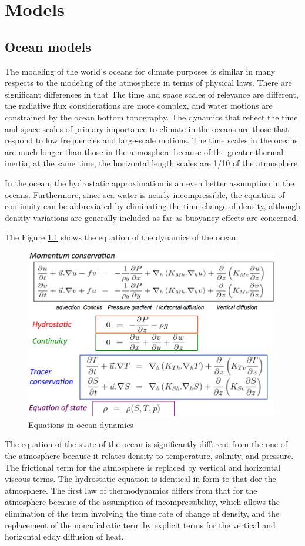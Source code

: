 
\chapter{Models}
\section{Ocean models}
The modeling of the world's oceans for climate purposes is similar in many respects to the modeling of the atmosphere in terms of physical laws. There are significant differences in that
The time and space scales of relevance are different, the radiative flux considerations are more complex, and water motions are constrained by the ocean bottom topography.
The dynamics that reflect the time and space scales of primary importance to climate in the oceans are those that respond to low frequencies and large-scale motions.
The time scales in the oceans are much longer than those in the atmosphere because of the greater thermal inertia; at the same time, the horizontal length scales are 1/10 of the atmosphere.

In the ocean, the hydrostatic approximation is an even better assumption in the oceans. Furthermore, since sea water is nearly incompressible, the equation of continuity can be abbreviated by eliminating the time change of density, although density variations are generally included as far as buoyancy effects are concerned.

The Figure \ref{fig:equations in ocean dyn} shows the equation of the dynamics of the ocean.


\begin{figure}[h!]
	\centering
	\includegraphics[width=0.4\linewidth]{uploads/Screenshot 2024-11-21 225126.png}
	\caption{Equations in ocean dynamics}
	\label{fig:equations in ocean dyn}
\end{figure}
The equation of the state of the ocean is significantly different from the one of the atmosphere because it relates density to temperature, salinity, and pressure.
The frictional term for the atmosphere is replaced by vertical and horizontal viscous terms.
The hydrostatic equation is identical in form to that dor the atmosphere.
The first law of thermodynamics differs from that for the atmosphere because of the assumption of incompressibility, which allows the elimination of the term involving the time rate of change of density, and the replacement of the nonadiabatic term by explicit terms for the vertical and horizontal eddy diffusion of heat. \\


